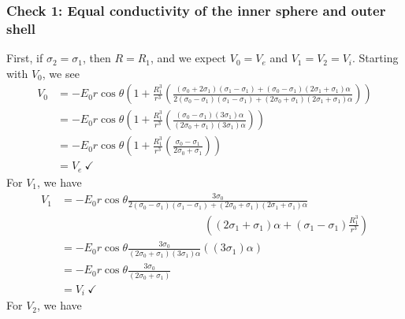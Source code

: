 \subsubsection{Check 1: Equal conductivity of the inner sphere and outer shell}
First, if $\sigma_2 = \sigma_1$, then $R=R_1$, and we expect $V_0=V_e$ and $V_1=V_2=V_i$. Starting with $V_0$, we see
\begin{displaymath}
    \begin{split}
    V_0
    &= -E_0 r \cos\theta
    \left(1+
    \frac{R_1^{3}}{r^3}
    \left(
    \frac{
    (\sigma_0 + 2\sigma_1)(\sigma_1 - \sigma_1) + (\sigma_0 - \sigma_1)(2\sigma_1 + \sigma_1)\alpha
    }
    {
    2 (\sigma_0-\sigma_1)(\sigma_1 - \sigma_1) + (2\sigma_0 + \sigma_1)(2\sigma_1 + \sigma_1)\alpha
    }
    \right)\right)
    \\
        &= -E_0 r \cos\theta
    \left(1+
    \frac{R_1^{3}}{r^3}
    \left(
    \frac{
    (\sigma_0 - \sigma_1)(3\sigma_1)\alpha
    }
    {
    (2\sigma_0 + \sigma_1)(3\sigma_1)\alpha
    }
    \right)\right)
    \\
    &= -E_0 r \cos\theta
    \left(1+
    \frac{R_1^{3}}{r^3}
    \left(
    \frac{
    \sigma_0 - \sigma_1
    }
    {
    2\sigma_0 + \sigma_1
    }
    \right)\right)
    \\
    &= V_e ~\checkmark
    \end{split}
\end{displaymath}
For $V_1$, we have
\begin{displaymath}
    \begin{split}
    V_1
    &=
    -E_0r\cos\theta\frac{3\sigma_0}{2 (\sigma_0-\sigma_1)(\sigma_1 - \sigma_1) + (2\sigma_0 + \sigma_1)(2\sigma_1 + \sigma_1)\alpha}
    \\&\quad\quad\quad\quad\quad\quad\quad\quad\quad\quad\quad\quad\quad\left(
            (2\sigma_1 + \sigma_1)\alpha +
             (\sigma_1 - \sigma_1) \frac{R_1^3}{r^3}
    \right)
    \\
    &=
    -E_0r\cos\theta\frac{3\sigma_0}{(2\sigma_0 + \sigma_1)(3\sigma_1)\alpha}
    \left(
            (3\sigma_1)\alpha
    \right)
    \\
    &=
    -E_0r\cos\theta\frac{3\sigma_0}{(2\sigma_0 + \sigma_1)}
    \\
    &=
    V_i ~\checkmark
    \end{split}
\end{displaymath}
For $V_2$, we have
